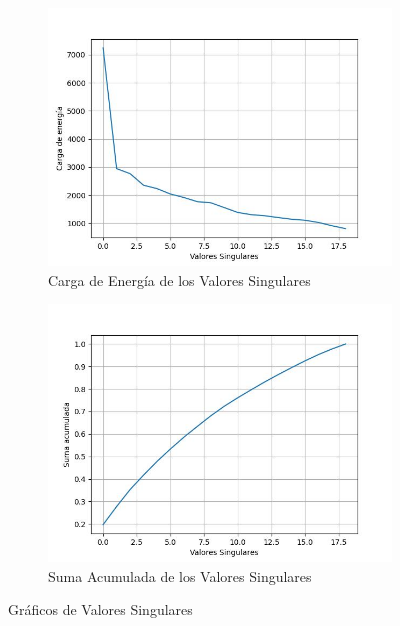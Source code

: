 \documentclass[12pt,a4]{article} %
\begin{document}
\begin{figure}[H]
    \centering
    \begin{subfigure}{0.45\textwidth}
        \includegraphics[width=\linewidth]{latex_project/Graficos_ej2/singular_values.jpeg}
        \caption{Carga de Energía de los Valores Singulares}
        \label{fig:singular_values}
    \end{subfigure}
    \hfill
    \begin{subfigure}{0.45\textwidth}
        \includegraphics[width=\linewidth]{latex_project/Graficos_ej2/cumulative_sum.jpeg}
        \caption{Suma Acumulada de los Valores Singulares}
        \label{fig:sv_cumsum}
    \end{subfigure}
    \caption{Gráficos de Valores Singulares}
    \label{fig:sv_graphs}
\end{figure}
\end{document}
